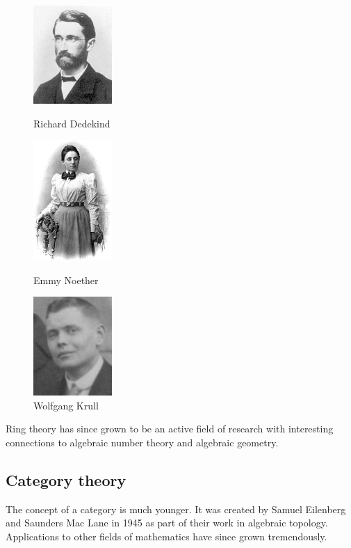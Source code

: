 \begin{figure}[H]
\centering
\begin{minipage}{0.25\textwidth}
\centering
\includegraphics[width=3cm]{images/dedekind.jpeg}
\caption*{Richard Dedekind}
\end{minipage}\hfill
\begin{minipage}{0.25\textwidth}
\centering
\includegraphics[width=3cm]{images/noether.jpg}
\caption*{Emmy Noether}
\end{minipage}\hfill
\begin{minipage}{0.25\textwidth}
\centering
\includegraphics[width=3cm]{images/krull.jpg}
\caption*{Wolfgang Krull}
\end{minipage}\hfill
\end{figure}

Ring theory has since grown to be an active field of research with interesting connections to
algebraic number theory and algebraic geometry.

\subsection{Category theory}

The concept of a category is much younger. It was created  by  Samuel  Eilenberg  and  Saunders  Mac Lane  in
1945 as part of their work in algebraic topology. Applications to other fields of mathematics
have since grown tremendously.  

